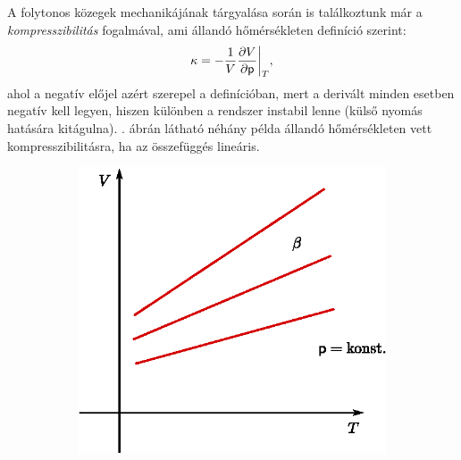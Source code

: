 A folytonos közegek mechanikájának tárgyalása során is találkoztunk már a \emph{kompresszibilitás} fogalmával, ami állandó hőmérsékleten definíció szerint:
\begin{align}
    \kappa = -\frac{1}{V} \frac{\partial{V}}{\partial{\mathsf p}}\bigg|_T,
\end{align}
ahol a negatív előjel azért szerepel a definícióban, mert a derivált minden esetben negatív kell legyen, hiszen különben a rendszer instabil lenne (külső nyomás hatására kitágulna). . ábrán látható néhány példa állandó hőmérsékleten vett kompresszibilitásra, ha az összefüggés lineáris. 
\begin{figure}[htb]
    \centering
    \begin{subfigure}[b]{0.48\textwidth}
            \centering
            \includegraphics[width=\textwidth]{termo_2/termo_2_3}
            \label{fig:termo_2_3}
    \end{subfigure}\hfill
    \begin{subfigure}[b]{0.45\textwidth}
            \centering

\end{subfigure}
\end{figure}
